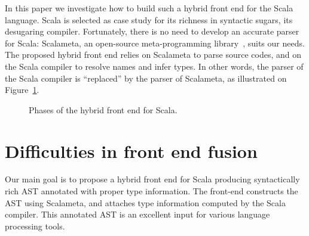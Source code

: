 \documentclass[11pt]{amsart}
\begin{document}
In this paper we investigate how to build such a hybrid front end for
the Scala language.
Scala is selected as case study for its richness in syntactic sugars,
its desugaring compiler.
Fortunately, there is no need to develop an
accurate parser for Scala: Scalameta, an open-source meta-programming
library~\cite{scalameta}, suits our needs. The proposed hybrid front end relies on Scalameta to
parse source codes, and on the Scala compiler to resolve names and
infer types. In other words, the parser of the Scala
compiler is ``replaced'' by the parser of Scalameta, as
illustrated on Figure~\ref{fig:hybrid-front-end}.

\begin{figure}[!htb]
  \centering
  \usetikzlibrary{positioning}
  \caption{Phases of the hybrid front end for Scala.}
  \label{fig:hybrid-front-end}
\end{figure}


\section{Difficulties in front end fusion}
\label{sec:req}

Our main goal is to propose a hybrid front end for Scala producing syntactically
rich AST annotated with proper type information. The front-end constructs the AST
using Scalameta, and attaches
type information computed by the Scala compiler. This annotated AST
is an excellent input for various language processing tools.
\end{document}
